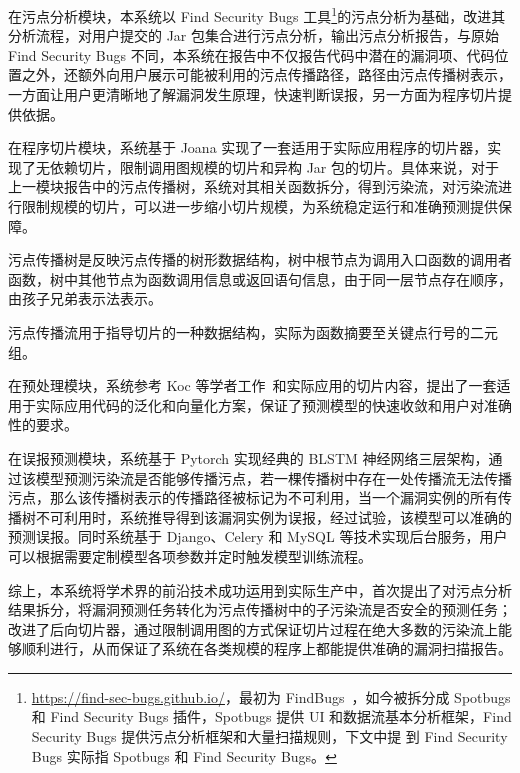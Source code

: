 在污点分析模块，本系统以 Find Security Bugs  工具\footnote{\url{https://find-sec-bugs.github.io/}，最初为 FindBugs~\cite{taint:finding}，如今被拆分成 Spotbugs 和 Find Security Bugs 插件，Spotbugs 提供 UI 和数据流基本分析框架，Find Security Bugs 提供污点分析框架和大量扫描规则，下文中提 到 Find Security Bugs 实际指 Spotbugs 和 Find Security Bugs。}的污点分析为基础，改进其分析流程，对用户提交的 Jar 包集合进行污点分析，输出污点分析报告，与原始 Find Security Bugs 不同，本系统在报告中不仅报告代码中潜在的漏洞项、代码位置之外，还额外向用户展示可能被利用的污点传播路径，路径由污点传播树表示，一方面让用户更清晰地了解漏洞发生原理，快速判断误报，另一方面为程序切片提供依据。

在程序切片模块，系统基于 Joana 实现了一套适用于实际应用程序的切片器，实现了无依赖切片，限制调用图规模的切片和异构 Jar 包的切片。具体来说，对于上一模块报告中的污点传播树，系统对其相关函数拆分，得到污染流，对污染流进行限制规模的切片，可以进一步缩小切片规模，为系统稳定运行和准确预测提供保障。

\begin{definition}[污点传播树]
    污点传播树是反映污点传播的树形数据结构，树中根节点为调用入口函数的调用者函数，树中其他节点为函数调用信息或返回语句信息，由于同一层节点存在顺序，由孩子兄弟表示法表示。
\end{definition}

\begin{definition}[污点传播流]
    污点传播流用于指导切片的一种数据结构，实际为函数摘要至关键点行号的二元组。
\end{definition}

在预处理模块，系统参考 Koc 等学者工作~\cite{Koc2019}和实际应用的切片内容，提出了一套适用于实际应用代码的泛化和向量化方案，保证了预测模型的快速收敛和用户对准确性的要求。

在误报预测模块，系统基于 Pytorch 实现经典的 BLSTM 神经网络三层架构，通过该模型预测污染流是否能够传播污点，若一棵传播树中存在一处传播流无法传播污点，那么该传播树表示的传播路径被标记为不可利用，当一个漏洞实例的所有传播树不可利用时，系统推导得到该漏洞实例为误报，经过试验，该模型可以准确的预测误报。同时系统基于 Django、Celery 和 MySQL 等技术实现后台服务，用户可以根据需要定制模型各项参数并定时触发模型训练流程。

综上，本系统将学术界的前沿技术成功运用到实际生产中，首次提出了对污点分析结果拆分，将漏洞预测任务转化为污点传播树中的子污染流是否安全的预测任务；改进了后向切片器，通过限制调用图的方式保证切片过程在绝大多数的污染流上能够顺利进行，从而保证了系统在各类规模的程序上都能提供准确的漏洞扫描报告。

